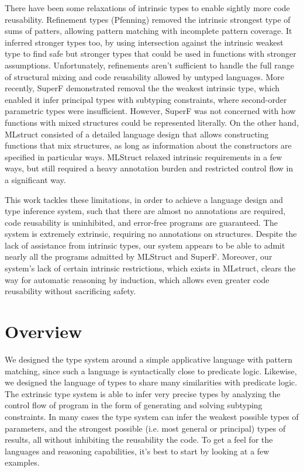 \documentclass[acmsmall]{acmart}
\theoremstyle{definition}
\begin{document}
There have been some relaxations of intrinsic types to enable sightly more code reusability.
Refinement types (Pfenning) \cite{} removed the intrinsic strongest type of sums of patters,
allowing pattern matching with incomplete pattern coverage. It inferred stronger
types too, by using intersection against the intrinsic weakest type to find safe but stronger types
that could be used in functions with stronger assumptions. 
Unfortunately, refinements aren't sufficient to handle the full range of structural mixing 
and code reusability allowed by untyped languages.
More recently, SuperF \cite{} demonstrated removal the the weakest intrinsic type,
which enabled it infer principal types with subtyping constraints, 
where second-order parametric
types were insufficient. However, SuperF was not concerned with how functions
with mixed structures could be represented literally.
On the other hand, MLstruct \cite{} consisted of a detailed language design that allows
constructing functions that mix structures, as long as information about the constructors
are specified in particular ways. 
MLStruct relaxed intrinsic requirements in a few ways, but still required a heavy annotation
burden and restricted control flow in a significant way.

This work tackles these limitations, in order to achieve a language design and type inference system,
such that there are almost no annotations are required, code reusability is uninhibited, and error-free programs
are guaranteed. The system is extremely extrinsic, requiring no annotations on structures.  
Despite the lack of assistance from intrinsic types, our system appears to be able to admit
nearly all the programs admitted by MLStruct and SuperF.
Moreover, our system's lack of certain intrinsic restrictions, which exists in MLstruct, 
clears the way for automatic reasoning by induction, which allows even greater code reusability
without sacrificing safety.  

\section{Overview}
\label{sec:overview}
We designed the type system around a simple applicative language with pattern matching,
since such a language is syntactically close to predicate logic. Likewise,
we designed the language of types to share many similarities with predicate logic. 
The extrinsic type system is able to infer very precise types by analyzing the control
flow of program in the form of generating and solving subtyping constraints. 
In many cases the type system can infer the weakest possible types of parameters,
and the strongest possible (i.e. most general or principal) types of results,
all without inhibiting the reusability the code.
To get a feel for the languages and reasoning capabilities, it's best to start by
looking at a few examples.
\end{document}
